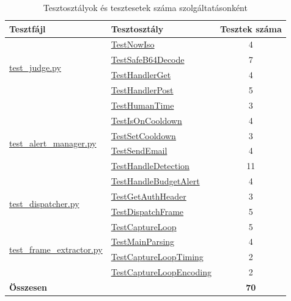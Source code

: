 \documentclass[12pt,a4paper]{article}
\newcommand{\tname}[1]{\url{#1}}
\begin{document}
\begin{table}[H]
\centering
\caption{Tesztosztályok és tesztesetek száma szolgáltatásonként}
\renewcommand{\arraystretch}{1.2}
\small
\begin{tabular}{|p{4.5cm}|p{4.5cm}|c|}
    \hline
    \textbf{Tesztfájl} & \textbf{Tesztosztály} & \textbf{Tesztek száma} \\
    \hline
    \multirow{4}{4.5cm}{\tname{test\_judge.py}}
        & \tname{TestNowIso} & 4 \\
        & \tname{TestSafeB64Decode} & 7 \\
        & \tname{TestHandlerGet} & 4 \\
        & \tname{TestHandlerPost} & 5 \\
    \hline
    \multirow{6}{4.5cm}{\tname{test\_alert\_manager.py}}
        & \tname{TestHumanTime} & 3 \\
        & \tname{TestIsOnCooldown} & 4 \\
        & \tname{TestSetCooldown} & 3 \\
        & \tname{TestSendEmail} & 4 \\
        & \tname{TestHandleDetection} & 11 \\
        & \tname{TestHandleBudgetAlert} & 4 \\
    \hline
    \multirow{2}{4.5cm}{\tname{test\_dispatcher.py}}
        & \tname{TestGetAuthHeader} & 3 \\
        & \tname{TestDispatchFrame} & 5 \\
    \hline
    \multirow{4}{4.5cm}{\tname{test\_frame\_extractor.py}}
        & \tname{TestCaptureLoop} & 5 \\
        & \tname{TestMainParsing} & 4 \\
        & \tname{TestCaptureLoopTiming} & 2 \\
        & \tname{TestCaptureLoopEncoding} & 2 \\
    \hline
    \multicolumn{2}{|l|}{\textbf{Összesen}} & \textbf{70} \\
    \hline
\end{tabular}
\end{table}
\end{document}

